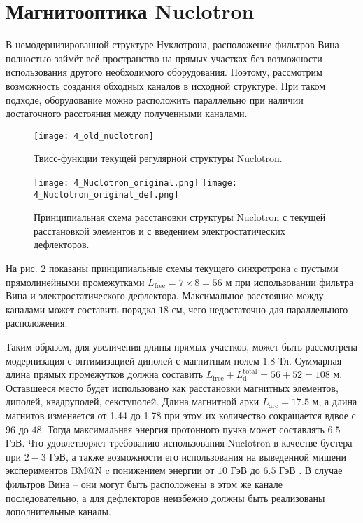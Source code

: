 	\section{Магнитооптика Nuclotron}\label{sec:EDM/optics}
	
\par В немодернизированной структуре Нуклотрона, расположение фильтров Вина полностью займёт всё пространство на прямых участках без возможности использования другого необходимого оборудования. Поэтому, рассмотрим возможность создания обходных каналов в исходной структуре. При таком подходе, оборудование можно расположить параллельно при наличии достаточного расстояния между полученными каналами.

\begin{figure}[!h]
  \centering
	\texttt{[image: 4\_old\_nuclotron]}
   \caption{Твисс-функции текущей регулярной структуры Nuclotron.}
   \label{fig:4_old_nuclotron}
\end{figure}

\begin{figure}[!h]
  \centering
   \texttt{[image: 4\_Nuclotron\_original.png]}
   \texttt{[image: 4\_Nuclotron\_original\_def.png]}
   \caption{Принципиальная схема расстановки структуры Nuclotron с текущей расстановкой элементов и с введением электростатических дефлекторов.}
   \label{fig:4_Nuclotron_original}
\end{figure}

\noindent На рис. \ref{fig:4_Nuclotron_original} показаны принципиальные схемы текущего синхротрона c пустыми прямолинейными промежутками $L_{\textrm{free}} = 7 \times 8 = 56$ м при использовании фильтра Вина и электростатического дефлектора. Максимальное расстояние между каналами может составить порядка $18$ см, чего недостаточно для параллельного расположения.

\par Таким образом, для увеличения длины прямых участков, может быть рассмотрена модернизация с оптимизацией диполей с магнитным полем $1.8$ Тл. Суммарная длина прямых промежутков должна составить $L_{\textrm{free}}+L^{\textrm{total}}_{\textrm{d}}=56+52 = 108$ м. Оставшееся место будет использовано как расстановки магнитных элементов, диполей, квадруполей, секступолей. Длина магнитной арки $L_{\textrm{arc}}=17.5$ м, а длина магнитов изменяется от 1.44 до 1.78 при этом их количество сокращается вдвое с $96$ до $48$. Тогда максимальная энергия протонного пучка может составлять $6.5$ ГэВ. Что удовлетворяет требованию использования Nuclotron в качестве бустера при $2-3$ ГэВ, а также возможности его использования на выведенной мишени экспериментов BM@N c понижением энергии от $10$ ГэВ до $6.5$ ГэВ \cite{kovalenko:nuclotron}. В случае фильтров Вина – они могут быть расположены в этом же канале последовательно, а для дефлекторов неизбежно должны быть реализованы дополнительные каналы.

